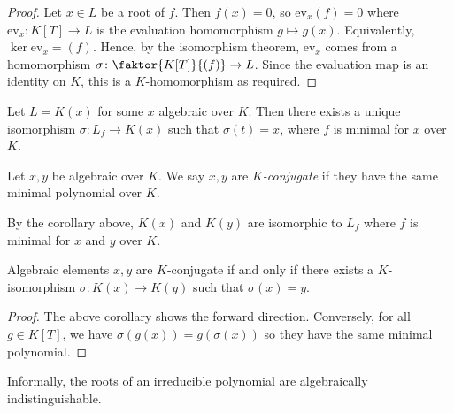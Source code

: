 \begin{proof}
	Let \( x \in L \) be a root of \( f \).
	Then \( f(x) = 0 \), so \( \mathrm{ev}_x(f) = 0 \) where \( \mathrm{ev}_x \colon K[T] \to L \) is the evaluation homomorphism \( g \mapsto g(x) \).
	Equivalently, \( \ker \mathrm{ev}_x = (f) \).
	Hence, by the isomorphism theorem, \( \mathrm{ev}_x \) comes from a homomorphism \( \sigma \colon \faktor{K[T]}{(f)} \to L \).
	Since the evaluation map is an identity on \( K \), this is a \( K \)-homomorphism as required.
\end{proof}
\begin{corollary}
	Let \( L = K(x) \) for some \( x \) algebraic over \( K \).
	Then there exists a unique isomorphism \( \sigma \colon L_f \to K(x) \) such that \( \sigma(t) = x \), where \( f \) is minimal for \( x \) over \( K \).
\end{corollary}
\begin{definition}
	Let \( x, y \) be algebraic over \( K \).
	We say \( x, y \) are \emph{\( K \)-conjugate} if they have the same minimal polynomial over \( K \).
\end{definition}
By the corollary above, \( K(x) \) and \( K(y) \) are isomorphic to \( L_f \) where \( f \) is minimal for \( x \) and \( y \) over \( K \).
\begin{corollary}
	Algebraic elements \( x, y \) are \( K \)-conjugate if and only if there exists a \( K \)-isomorphism \( \sigma \colon K(x) \to K(y) \) such that \( \sigma(x) = y \).
\end{corollary}
\begin{proof}
	The above corollary shows the forward direction.
	Conversely, for all \( g \in K[T] \), we have \( \sigma(g(x)) = g(\sigma(x)) \) so they have the same minimal polynomial.
\end{proof}
Informally, the roots of an irreducible polynomial are algebraically indistinguishable.


